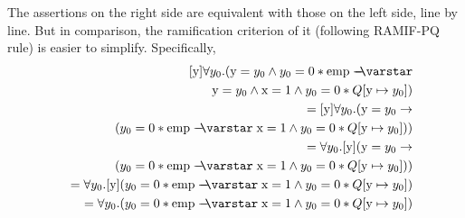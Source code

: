 {The assertions on the right side are equivalent with those on the left side, line by line. But in comparison, the ramification criterion of it (following RAMIF-PQ rule) is easier to simplify. Specifically,
\begin{eqnarray*}
&&~~~~[\mathrm{y}]\forall y_0. (\mathrm{y} = y_0 \wedge y_0 = 0 * \mathrm{emp} \wand \\
&& ~~~~~~~~~   \mathrm{y} = y_0 \wedge \mathrm{x} = 1  \wedge y_0 = 0 * Q[\mathrm{y} \mapsto y_0]) \\
&&= [\mathrm{y}]\forall y_0. (\mathrm{y} = y_0 \to \\
&& ~~~~~~~~~ (y_0 = 0 * \mathrm{emp} \wand \mathrm{x} = 1  \wedge y_0 = 0 * Q[\mathrm{y} \mapsto y_0])) \\
&&= \forall y_0. [\mathrm{y}](\mathrm{y} = y_0 \to \\
&& ~~~~~~~~~ (y_0 = 0 * \mathrm{emp} \wand \mathrm{x} = 1  \wedge y_0 = 0 * Q[\mathrm{y} \mapsto y_0])) \\
&&= \forall y_0. [\mathrm{y}](y_0 = 0 * \mathrm{emp} \wand \mathrm{x} = 1  \wedge y_0 = 0 * Q[\mathrm{y} \mapsto y_0]) \\
&&= \forall y_0. (y_0 = 0 * \mathrm{emp} \wand \mathrm{x} = 1  \wedge y_0 = 0 * Q[\mathrm{y} \mapsto y_0])
\end{eqnarray*}
}




